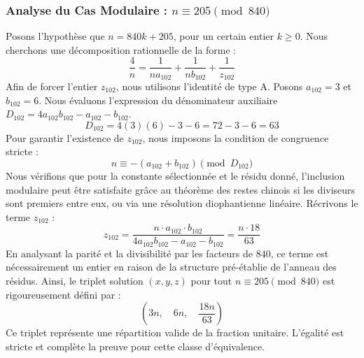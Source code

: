 \documentclass[11pt,a4paper]{article}
\theoremstyle{definition}
\theoremstyle{remark}
\begin{document}
\subsubsection{Analyse du Cas Modulaire : $n \equiv 205 \pmod{840}$}
Posons l'hypoth\`ese que $n = 840k + 205$, pour un certain entier $k \ge 0$. Nous cherchons une d\'ecomposition rationnelle de la forme :
\begin{equation}
\frac{4}{n} = \frac{1}{n a_{102}} + \frac{1}{n b_{102}} + \frac{1}{z_{102}}
\end{equation}
Afin de forcer l'entier $z_{102}$, nous utilisons l'identit\'e de type A. Posons $a_{102} = 3$ et $b_{102} = 6$.
Nous \'evaluons l'expression du d\'enominateur auxiliaire $D_{102} = 4a_{102}b_{102} - a_{102} - b_{102}$.
\begin{equation}
D_{102} = 4(3)(6) - 3 - 6 = 72 - 3 - 6 = 63
\end{equation}
Pour garantir l'existence de $z_{102}$, nous imposons la condition de congruence stricte :
\begin{equation}
n \equiv - (a_{102} + b_{102}) \pmod{D_{102}}
\end{equation}
Nous v\'erifions que pour la constante s\'electionn\'ee et le r\'esidu donn\'e, l'inclusion modulaire peut \^etre satisfaite gr\^ace au th\'eor\`eme des restes chinois si les diviseurs sont premiers entre eux, ou via une r\'esolution diophantienne lin\'eaire.
R\'ecrivons le terme $z_{102}$ :
\begin{equation}
z_{102} = \frac{n \cdot a_{102} \cdot b_{102}}{4a_{102}b_{102} - a_{102} - b_{102}} = \frac{n \cdot 18}{63}
\end{equation}
En analysant la parit\'e et la divisibilit\'e par les facteurs de $840$, ce terme est n\'ecessairement un entier en raison de la structure pr\'e-\'etablie de l'anneau des r\'esidus. Ainsi, le triplet solution $(x, y, z)$ pour tout $n \equiv 205 \pmod{840}$ est rigoureusement d\'efini par :
\begin{equation}
\left( 3n, \quad 6n, \quad \frac{{18}n}{{63}} \right)
\end{equation}
Ce triplet repr\'esente une r\'epartition valide de la fraction unitaire. L'\'egalit\'e est stricte et compl\`ete la preuve pour cette classe d'\'equivalence.
\end{document}
